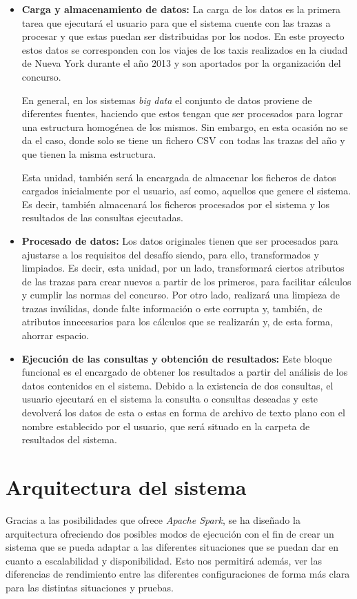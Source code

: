 \begin{itemize}
\item \textbf{Carga y almacenamiento de datos:} La carga de los datos es la primera tarea que ejecutará el usuario para que el sistema cuente con las trazas a procesar y que estas puedan ser distribuidas por los nodos. En este proyecto estos datos se corresponden con los viajes de los taxis realizados en la ciudad de Nueva York durante el año 2013 y son aportados por la organización del concurso.

En general, en los sistemas \textit{big data} el conjunto de datos proviene de diferentes fuentes, haciendo que estos tengan que ser procesados para lograr una estructura homogénea de los mismos. Sin embargo, en esta ocasión no se da el caso, donde solo se tiene un fichero \gls{CSV} con todas las trazas del año y que tienen la misma estructura.

Esta unidad, también será la encargada de almacenar los ficheros de datos cargados inicialmente por el usuario, así como, aquellos que genere el sistema. Es decir, también almacenará los ficheros procesados por el sistema y los resultados de las consultas ejecutadas.

\item \textbf{Procesado de datos:} Los datos originales tienen que ser procesados para ajustarse a los requisitos del desafío siendo, para ello, transformados y limpiados. Es decir, esta unidad, por un lado, transformará ciertos atributos de las trazas para crear nuevos a partir de los primeros, para facilitar cálculos y cumplir las normas del concurso. Por otro lado, realizará una limpieza de trazas inválidas, donde falte información o este corrupta y, también, de atributos innecesarios para los cálculos que se realizarán y, de esta forma, ahorrar espacio.

\item \textbf{Ejecución de las consultas y obtención de resultados:} Este bloque funcional es el encargado de obtener los resultados a partir del análisis de los datos contenidos en el sistema. Debido a la existencia de dos consultas, el usuario ejecutará en el sistema la consulta o consultas deseadas y este devolverá los datos de esta o estas en forma de archivo de texto plano con el nombre establecido por el usuario, que será situado en la carpeta de resultados del sistema.
\end{itemize}

\section{Arquitectura del sistema}
Gracias a las posibilidades que ofrece \textit{Apache Spark}, se ha diseñado la arquitectura ofreciendo dos posibles modos de ejecución con el fin de crear un sistema que se pueda adaptar a las diferentes situaciones que se puedan dar en cuanto a escalabilidad y disponibilidad. Esto nos permitirá además, ver las diferencias de rendimiento entre las diferentes configuraciones de forma más clara para las distintas situaciones y pruebas.

